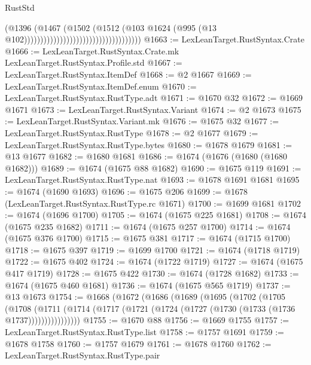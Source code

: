 \begin{lexlean}{RustStd}
\begin{coremodule}
                                                              (@1396
                                                                (@1467
                                                                  (@1502
                                                                    (@1512
                                                                      (@103
                                                                        @1624
                                                                        (@995
                                                                          (@13
                                                                            @102))))))))))))))))))))))))))))))))))))
@1663 := LexLeanTarget.RustSyntax.Crate
@1666 := LexLeanTarget.RustSyntax.Crate.mk LexLeanTarget.RustSyntax.Profile.std
@1667 := LexLeanTarget.RustSyntax.ItemDef
@1668 := @2 @1667
@1669 := LexLeanTarget.RustSyntax.ItemDef.enum
@1670 := LexLeanTarget.RustSyntax.RustType.adt
@1671 := @1670 @32
@1672 := @1669 @1671
@1673 := LexLeanTarget.RustSyntax.Variant
@1674 := @2 @1673
@1675 := LexLeanTarget.RustSyntax.Variant.mk
@1676 := @1675 @32
@1677 := LexLeanTarget.RustSyntax.RustType
@1678 := @2 @1677
@1679 := LexLeanTarget.RustSyntax.RustType.bytes
@1680 := @1678 @1679
@1681 := @13 @1677
@1682 := @1680 @1681
@1686 := @1674 (@1676 (@1680 (@1680 @1682)))
@1689 := @1674 (@1675 @88 @1682)
@1690 := @1675 @119
@1691 := LexLeanTarget.RustSyntax.RustType.nat
@1693 := @1678 @1691 @1681
@1695 := @1674 (@1690 @1693)
@1696 := @1675 @206
@1699 := @1678 (LexLeanTarget.RustSyntax.RustType.rc @1671)
@1700 := @1699 @1681
@1702 := @1674 (@1696 @1700)
@1705 := @1674 (@1675 @225 @1681)
@1708 := @1674 (@1675 @235 @1682)
@1711 := @1674 (@1675 @257 @1700)
@1714 := @1674 (@1675 @376 @1700)
@1715 := @1675 @381
@1717 := @1674 (@1715 @1700)
@1718 := @1675 @397
@1719 := @1699 @1700
@1721 := @1674 (@1718 @1719)
@1722 := @1675 @402
@1724 := @1674 (@1722 @1719)
@1727 := @1674 (@1675 @417 @1719)
@1728 := @1675 @422
@1730 := @1674 (@1728 @1682)
@1733 := @1674 (@1675 @460 @1681)
@1736 := @1674 (@1675 @565 @1719)
@1737 := @13 @1673
@1754 := @1668
    (@1672
      (@1686
        (@1689
          (@1695
            (@1702
              (@1705
                (@1708
                  (@1711
                    (@1714 (@1717 (@1721 (@1724 (@1727 (@1730 (@1733 (@1736 @1737))))))))))))))))
@1755 := @1670 @88
@1756 := @1669 @1755
@1757 := LexLeanTarget.RustSyntax.RustType.list
@1758 := @1757 @1691
@1759 := @1678 @1758
@1760 := @1757 @1679
@1761 := @1678 @1760
@1762 := LexLeanTarget.RustSyntax.RustType.pair

\end{coremodule}
\end{lexlean}
